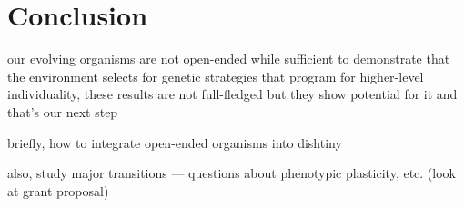 \section{Conclusion}

our evolving organisms are not open-ended
while sufficient to demonstrate that the environment selects for genetic strategies that program for higher-level individuality, these results are not full-fledged 
but they show potential for it and that's our next step

briefly, how to integrate open-ended organisms into dishtiny

also, study major transitions --- questions about phenotypic plasticity, etc. (look at grant proposal)
